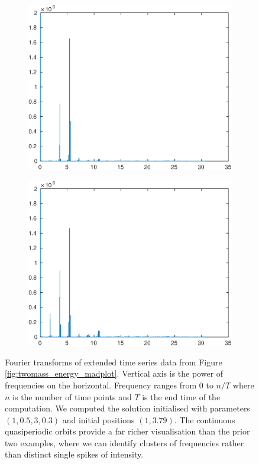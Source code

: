 \documentclass{report}
\begin{document}
\begin{figure}
	\begin{subfigure}[b]{0.5\textwidth}
		\includegraphics[width=\textwidth]{voiced_sounds/case_3/interesting_quasi_a.eps}
	\end{subfigure}
	\begin{subfigure}[b]{0.5\textwidth}
		\includegraphics[width=\textwidth]{voiced_sounds/case_3/interesting_quasi_b.eps}
	\end{subfigure}
	\caption{
		Fourier transforms of extended time series data from Figure \ref{fig:twomass_energy_madplot}.
		Vertical axis is the power of frequencies on the horizontal.
		Frequency ranges from $0$ to $n/T$ where $n$ is the number of time points and $T$ is the end time of the computation.
		We computed the solution initialised with parameters \((1, 0.5, 3, 0.3)\) and initial positions \((1,3.79)\).
		The continuous quasiperiodic orbits provide a far richer visualisation than the prior two examples,
		where we can identify clusters of frequencies rather than distinct single spikes of intensity.
	}
	\label{fig:twomass_fourier_madplot}
\end{figure}
\end{document}
